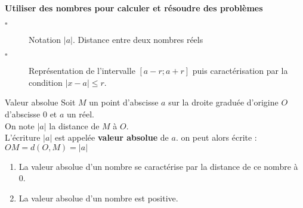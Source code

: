 \begin{titre}

\end{titre}


\begin{CpsCol}
\textbf{Utiliser des nombres pour calculer et résoudre des problèmes}
\begin{description}
\item[$\square$] Notation $\vert a\vert$. Distance entre deux nombres réels
\item[$\square$] Représentation de l'intervalle $[a-r;a+r]$ puis caractérisation par la condition $\vert x-	a\vert \leq r$.
\end{description}
\end{CpsCol}


\begin{DefT}{Valeur absolue}
Soit $M$ un point d'abscisse $a$ sur la droite graduée d'origine $O$ d'abscisse 0 et $a$ un réel.\\
On note $\vert a\vert$ la distance de $M$ à $O$.\\
L'écriture $\vert a\vert$ est appelée \textbf{valeur absolue} de $a$. on peut alors écrite : $OM = d(O,M)=\vert a\vert$
\end{DefT}



\begin{Rq}
\begin{enumerate}
\item La valeur absolue d'un nombre se caractérise par la distance de ce nombre à 0.
\item La valeur absolue d'un nombre est positive.
\end{enumerate}
\end{Rq}


